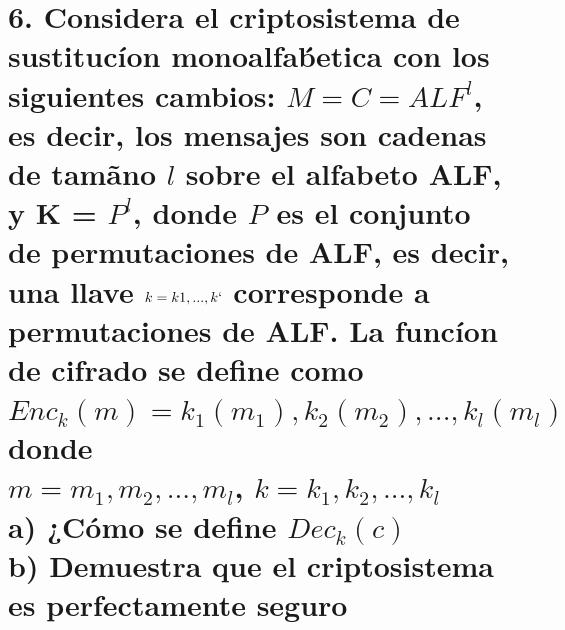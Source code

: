 \documentclass[11pt]{article}
\begin{document}
        
        
        
        
        
        
        
         \section*{6. Considera el criptosistema de sustitucíon monoalfab́etica con los siguientes cambios:  $ M = C =
ALF^{l}$, es decir, los mensajes son cadenas de tamãno $l$ sobre el alfabeto ALF, y K = $P^{l}$, donde $P$ es el conjunto de permutaciones de ALF, es decir, una llave $k = k1, . . . , k`$ corresponde a 
permutaciones de ALF. La funcíon de cifrado se define como \\
$Enc_{k}(m) = k_1(m_1),k_2(m_2),...,k_l(m_l)$ donde\\ $m = m_1,m_2,...,m_l$,  $k = k_1,k_2,...,k_l$\\
a) ¿Cómo se define $Dec_k(c)$\\
b) Demuestra que el criptosistema es perfectamente seguro
}
\end{document}
